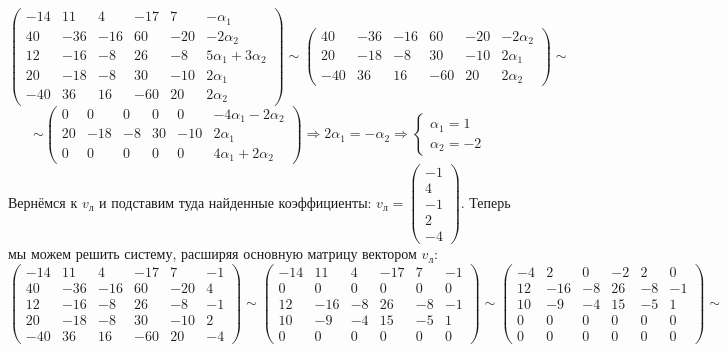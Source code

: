 \documentclass{article}
\begin{document}
$$\left(\begin{array}{ccccc|c}
-14 & 11 & 4 & -17 & 7 & -\alpha_1 \\
40 & -36 & -16 & 60 & -20 & -2\alpha_2 \\
12 & -16 & -8 & 26 & -8 & 5\alpha_1+3\alpha_2 \\
20 & -18 & -8 & 30 & -10 & 2\alpha_1 \\
-40 & 36 & 16 & -60 & 20 & 2\alpha_2
\end{array}\right) \sim \left(\begin{array}{ccccc|c}
40 & -36 & -16 & 60 & -20 & -2\alpha_2 \\
20 & -18 & -8 & 30 & -10 & 2\alpha_1 \\
-40 & 36 & 16 & -60 & 20 & 2\alpha_2
\end{array}\right) \sim  $$
$$ \sim \left(\begin{array}{ccccc|c}
0 & 0 & 0 & 0 & 0 & -4\alpha_1-2\alpha_2 \\
20 & -18 & -8 & 30 & -10 & 2\alpha_1 \\
0 & 0 & 0 & 0 & 0 & 4\alpha_1+2\alpha_2
\end{array}\right) \Rightarrow 2\alpha_1=-\alpha_2 \Rightarrow \begin{cases}
\alpha_1 = 1 \\ \alpha_2 = -2
\end{cases}$$
Вернёмся к $v_л$ и подставим туда найденные коэффициенты: $v_л = \begin{pmatrix}-1 \\ 4 \\ -1 \\ 2 \\ -4\end{pmatrix}$. Теперь мы можем решить систему, расширяя основную матрицу вектором $v_л$:
$$\left(\begin{array}{ccccc|c}
-14 & 11 & 4 & -17 & 7 & -1 \\
40 & -36 & -16 & 60 & -20 & 4 \\
12 & -16 & -8 & 26 & -8 & -1 \\
20 & -18 & -8 & 30 & -10 & 2 \\
-40 & 36 & 16 & -60 & 20 & -4
\end{array}\right) \sim \left(\begin{array}{ccccc|c}
-14 & 11 & 4 & -17 & 7 & -1 \\
0 & 0 & 0 & 0 & 0 & 0 \\
12 & -16 & -8 & 26 & -8 & -1 \\
10 & -9 & -4 & 15 & -5 & 1 \\
0 & 0 & 0 & 0 & 0 & 0
\end{array}\right) \sim \left(\begin{array}{ccccc|c}
-4 & 2 & 0 & -2 & 2 & 0 \\
12 & -16 & -8 & 26 & -8 & -1 \\
10 & -9 & -4 & 15 & -5 & 1 \\
0 & 0 & 0 & 0 & 0 & 0 \\
0 & 0 & 0 & 0 & 0 & 0
\end{array}\right) \sim$$
\end{document}
